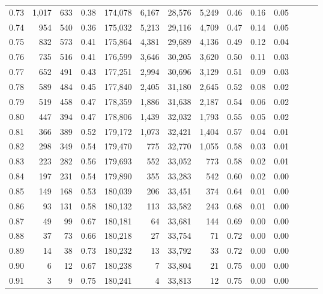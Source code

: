 \begin{tabular}{rrrrrrrrrrrrrr}
0.73 &  1,017 &    633 &  0.38 &  174,078 &    6,167 &  28,576 &   5,249 &  0.46 &  0.16 &      0.05 \\
0.74 &    954 &    540 &  0.36 &  175,032 &    5,213 &  29,116 &   4,709 &  0.47 &  0.14 &      0.05 \\
0.75 &    832 &    573 &  0.41 &  175,864 &    4,381 &  29,689 &   4,136 &  0.49 &  0.12 &      0.04 \\
0.76 &    735 &    516 &  0.41 &  176,599 &    3,646 &  30,205 &   3,620 &  0.50 &  0.11 &      0.03 \\
0.77 &    652 &    491 &  0.43 &  177,251 &    2,994 &  30,696 &   3,129 &  0.51 &  0.09 &      0.03 \\
0.78 &    589 &    484 &  0.45 &  177,840 &    2,405 &  31,180 &   2,645 &  0.52 &  0.08 &      0.02 \\
0.79 &    519 &    458 &  0.47 &  178,359 &    1,886 &  31,638 &   2,187 &  0.54 &  0.06 &      0.02 \\
0.80 &    447 &    394 &  0.47 &  178,806 &    1,439 &  32,032 &   1,793 &  0.55 &  0.05 &      0.02 \\
0.81 &    366 &    389 &  0.52 &  179,172 &    1,073 &  32,421 &   1,404 &  0.57 &  0.04 &      0.01 \\
0.82 &    298 &    349 &  0.54 &  179,470 &      775 &  32,770 &   1,055 &  0.58 &  0.03 &      0.01 \\
0.83 &    223 &    282 &  0.56 &  179,693 &      552 &  33,052 &     773 &  0.58 &  0.02 &      0.01 \\
0.84 &    197 &    231 &  0.54 &  179,890 &      355 &  33,283 &     542 &  0.60 &  0.02 &      0.00 \\
0.85 &    149 &    168 &  0.53 &  180,039 &      206 &  33,451 &     374 &  0.64 &  0.01 &      0.00 \\
0.86 &     93 &    131 &  0.58 &  180,132 &      113 &  33,582 &     243 &  0.68 &  0.01 &      0.00 \\
0.87 &     49 &     99 &  0.67 &  180,181 &       64 &  33,681 &     144 &  0.69 &  0.00 &      0.00 \\
0.88 &     37 &     73 &  0.66 &  180,218 &       27 &  33,754 &      71 &  0.72 &  0.00 &      0.00 \\
0.89 &     14 &     38 &  0.73 &  180,232 &       13 &  33,792 &      33 &  0.72 &  0.00 &      0.00 \\
0.90 &      6 &     12 &  0.67 &  180,238 &        7 &  33,804 &      21 &  0.75 &  0.00 &      0.00 \\
0.91 &      3 &      9 &  0.75 &  180,241 &        4 &  33,813 &      12 &  0.75 &  0.00 &      0.00 \\

\end{tabular}
